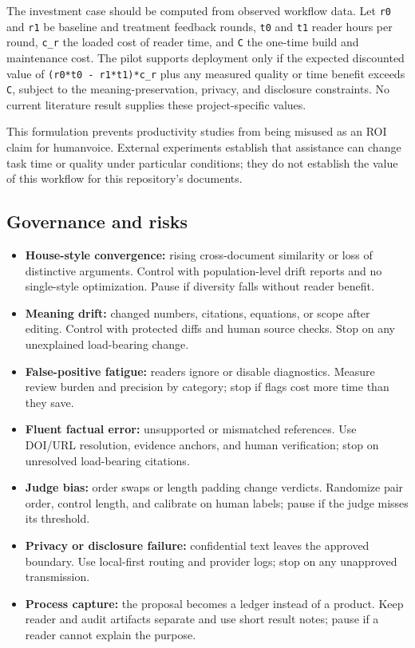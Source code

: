 \documentclass[11pt]{article}
\providecommand{\tightlist}{\setlength{\itemsep}{0pt}\setlength{\parskip}{0pt}}
\begin{document}
The investment case should be computed from observed workflow data. Let \texttt{r0} and \texttt{r1} be baseline and treatment feedback rounds, \texttt{t0} and \texttt{t1} reader hours per round, \texttt{c\_r} the loaded cost of reader time, and \texttt{C} the one-time build and maintenance cost. The pilot supports deployment only if the expected discounted value of \texttt{(r0*t0\ -\ r1*t1)*c\_r} plus any measured quality or time benefit exceeds \texttt{C}, subject to the meaning-preservation, privacy, and disclosure constraints. No current literature result supplies these project-specific values.

This formulation prevents productivity studies from being misused as an ROI claim for humanvoice. External experiments establish that assistance can change task time or quality under particular conditions; they do not establish the value of this workflow for this repository's documents.

\hypertarget{governance-and-risks}{%
\subsection{Governance and risks}\label{governance-and-risks}}

\begin{itemize}
\tightlist
\item
  \textbf{House-style convergence:} rising cross-document similarity or loss of distinctive arguments. Control with population-level drift reports and no single-style optimization. Pause if diversity falls without reader benefit.
\item
  \textbf{Meaning drift:} changed numbers, citations, equations, or scope after editing. Control with protected diffs and human source checks. Stop on any unexplained load-bearing change.
\item
  \textbf{False-positive fatigue:} readers ignore or disable diagnostics. Measure review burden and precision by category; stop if flags cost more time than they save.
\item
  \textbf{Fluent factual error:} unsupported or mismatched references. Use DOI/URL resolution, evidence anchors, and human verification; stop on unresolved load-bearing citations.
\item
  \textbf{Judge bias:} order swaps or length padding change verdicts. Randomize pair order, control length, and calibrate on human labels; pause if the judge misses its threshold.
\item
  \textbf{Privacy or disclosure failure:} confidential text leaves the approved boundary. Use local-first routing and provider logs; stop on any unapproved transmission.
\item
  \textbf{Process capture:} the proposal becomes a ledger instead of a product. Keep reader and audit artifacts separate and use short result notes; pause if a reader cannot explain the purpose.
\end{itemize}
\end{document}

